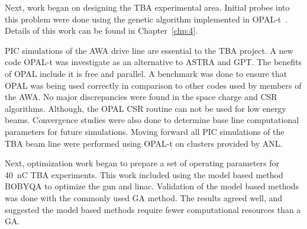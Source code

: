 Next, work began on designing the TBA experimental area. 
Initial probes into this problem were done using the genetic algorithm
implemented in OPAL-t~\cite{optpilot}. Details of this work can be found in Chapter~\ref{chp:4}.


PIC simulations of the AWA drive line are essential to the TBA project.
A new code OPAL-t was investigate as an alternative to ASTRA and GPT. 
The benefits of OPAL include it is free and parallel.
A benchmark was done to ensure that OPAL was being used correctly 
in comparison to other codes used by members of the AWA.
No major discrepancies were found in the space charge and CSR algorithms.
Although, the OPAL CSR routine can not be used for low energy beams.
Convergence studies were also done to determine base line computational 
parameters for future simulations.
Moving forward all PIC simulations of the TBA beam line were performed using OPAL-t on clusters provided by ANL.

Next, optimization work began to prepare a set of operating parameters for
\SI{40}{nC} TBA experiments. This work included using the model based method 
BOBYQA to optimize the gun and linac.
Validation of the model based methods was done with the commonly used 
GA method. The results agreed well, and suggested the model based 
methods require fewer computational resources than a GA. 






